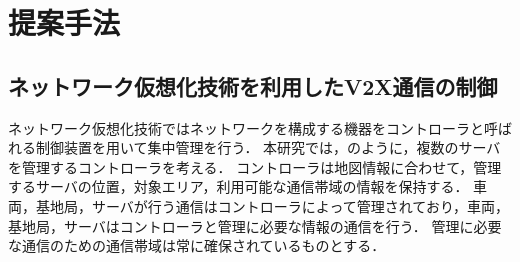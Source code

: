 \documentclass[a4paper,10pt,twocolumn,uplatex]{jsarticle}
\begin{document}

\section{提案手法}
\subsection{ネットワーク仮想化技術を利用したV2X通信の制御}
ネットワーク仮想化技術ではネットワークを構成する機器をコントローラと呼ばれる制御装置を用いて集中管理を行う．
本研究では，のように，複数のサーバを管理するコントローラを考える．
コントローラは地図情報に合わせて，管理するサーバの位置，対象エリア，利用可能な通信帯域の情報を保持する．
車両，基地局，サーバが行う通信はコントローラによって管理されており，車両，基地局，サーバはコントローラと管理に必要な情報の通信を行う．
管理に必要な通信のための通信帯域は常に確保されているものとする．
\end{document}
